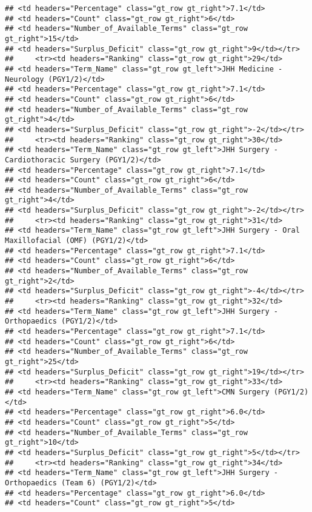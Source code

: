 \documentclass[
]{article}
\begin{document}
\begin{verbatim}
## <td headers="Percentage" class="gt_row gt_right">7.1</td>
## <td headers="Count" class="gt_row gt_right">6</td>
## <td headers="Number_of_Available_Terms" class="gt_row gt_right">15</td>
## <td headers="Surplus_Deficit" class="gt_row gt_right">9</td></tr>
##     <tr><td headers="Ranking" class="gt_row gt_right">29</td>
## <td headers="Term_Name" class="gt_row gt_left">JHH Medicine - Neurology (PGY1/2)</td>
## <td headers="Percentage" class="gt_row gt_right">7.1</td>
## <td headers="Count" class="gt_row gt_right">6</td>
## <td headers="Number_of_Available_Terms" class="gt_row gt_right">4</td>
## <td headers="Surplus_Deficit" class="gt_row gt_right">-2</td></tr>
##     <tr><td headers="Ranking" class="gt_row gt_right">30</td>
## <td headers="Term_Name" class="gt_row gt_left">JHH Surgery - Cardiothoracic Surgery (PGY1/2)</td>
## <td headers="Percentage" class="gt_row gt_right">7.1</td>
## <td headers="Count" class="gt_row gt_right">6</td>
## <td headers="Number_of_Available_Terms" class="gt_row gt_right">4</td>
## <td headers="Surplus_Deficit" class="gt_row gt_right">-2</td></tr>
##     <tr><td headers="Ranking" class="gt_row gt_right">31</td>
## <td headers="Term_Name" class="gt_row gt_left">JHH Surgery - Oral Maxillofacial (OMF) (PGY1/2)</td>
## <td headers="Percentage" class="gt_row gt_right">7.1</td>
## <td headers="Count" class="gt_row gt_right">6</td>
## <td headers="Number_of_Available_Terms" class="gt_row gt_right">2</td>
## <td headers="Surplus_Deficit" class="gt_row gt_right">-4</td></tr>
##     <tr><td headers="Ranking" class="gt_row gt_right">32</td>
## <td headers="Term_Name" class="gt_row gt_left">JHH Surgery - Orthopaedics (PGY1/2)</td>
## <td headers="Percentage" class="gt_row gt_right">7.1</td>
## <td headers="Count" class="gt_row gt_right">6</td>
## <td headers="Number_of_Available_Terms" class="gt_row gt_right">25</td>
## <td headers="Surplus_Deficit" class="gt_row gt_right">19</td></tr>
##     <tr><td headers="Ranking" class="gt_row gt_right">33</td>
## <td headers="Term_Name" class="gt_row gt_left">CMN Surgery (PGY1/2)</td>
## <td headers="Percentage" class="gt_row gt_right">6.0</td>
## <td headers="Count" class="gt_row gt_right">5</td>
## <td headers="Number_of_Available_Terms" class="gt_row gt_right">10</td>
## <td headers="Surplus_Deficit" class="gt_row gt_right">5</td></tr>
##     <tr><td headers="Ranking" class="gt_row gt_right">34</td>
## <td headers="Term_Name" class="gt_row gt_left">JHH Surgery - Orthopaedics (Team 6) (PGY1/2)</td>
## <td headers="Percentage" class="gt_row gt_right">6.0</td>
## <td headers="Count" class="gt_row gt_right">5</td>

\end{verbatim}
\end{document}
